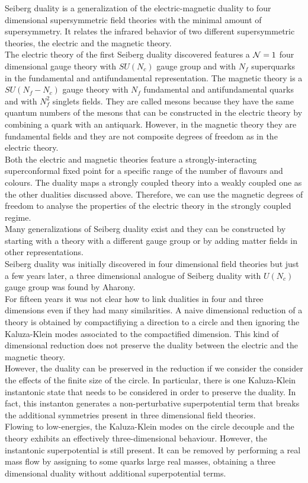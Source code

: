 Seiberg duality is a generalization of the electric-magnetic duality to four dimensional supersymmetric field theories with the minimal amount of supersymmetry.
It relates the infrared behavior of two different supersymmetric theories, the electric and the magnetic theory.\\
The electric theory of the first Seiberg duality discovered features a $\mathcal{N}=1$ four dimensional gauge theory with $SU(N_c)$ gauge group and with $N_f$ superquarks in the fundamental and antifundamental representation.
The magnetic theory is a $SU(N_f-N_c)$ gauge theory with $N_f$ fundamental and antifundamental quarks and with $N_f^2$ singlets fields. 
They are called mesons because they have the same quantum numbers of the mesons that can be constructed in the electric theory by combining a quark with an antiquark. 
However, in the magnetic theory they are fundamental fields and they are not composite degrees of freedom as in the electric theory.\\
Both the electric and magnetic theories feature a strongly-interacting superconformal fixed point for a specific range of the number of flavours and colours. 
The duality maps a strongly coupled theory into a weakly coupled one as the other dualities discussed above. 
Therefore, we can use the magnetic degrees of freedom to analyse the properties of the electric theory in the strongly coupled regime.\\
Many generalizations of Seiberg duality exist and they can be constructed by starting with a theory with a different gauge group or by adding matter fields in other representations.
\\
Seiberg duality was initially discovered in four dimensional field theories but just a few years later, a three dimensional analogue of Seiberg duality with $U(N_c)$ gauge group was found by Aharony.\\

For fifteen years it was not clear how to link dualities in four and three dimensions even if they had many similarities. 
A naive dimensional reduction of a theory is obtained by compactifiying a direction to a circle and then ignoring the Kaluza-Klein modes associated to the compactified dimension.
This kind of dimensional reduction does not preserve the duality between the electric and the magnetic theory.  \\
However, the duality can be preserved in the reduction if we consider the consider the effects of the finite size of the circle.
In particular, there is one Kaluza-Klein instantonic state that needs to be considered in order to preserve the duality.
In fact, this instanton generates a non-perturbative superpotential term that breaks the additional symmetries present in three dimensional field theories.\\
Flowing to low-energies, the Kaluza-Klein modes on the circle decouple and the theory exhibits an effectively three-dimensional behaviour.
However, the instantonic superpotential is still present. 
It can be removed by performing a real mass flow by assigning to some quarks large real masses, obtaining a three dimensional duality without additional superpotential terms.

